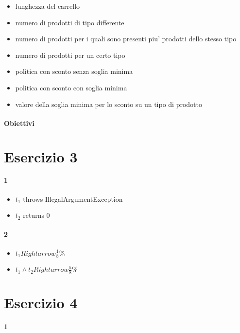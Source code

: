 \begin{itemize}
  \item lunghezza del carrello
  \item numero di prodotti di tipo differente
  \item numero di prodotti per i quali sono presenti piu' prodotti dello stesso tipo
  \item numero di prodotti per un certo tipo
  \item politica con sconto senza soglia minima
  \item politica con sconto con soglia minima
  \item valore della soglia minima per lo sconto su un tipo di prodotto
\end{itemize}

\paragraph{Obiettivi}

\section{Esercizio 3}

\paragraph{1}

\begin{itemize}
  \item $t_1$ throws IllegalArgumentException
  \item $t_2$ returns 0
\end{itemize}

\paragraph{2}

\begin{itemize}
  \item $t_1 Rightarrow \frac 1 8\%$
  \item $t_1 \land t_2 Rightarrow \frac 5 8\%$
\end{itemize}

\section{Esercizio 4}

\paragraph{1}


